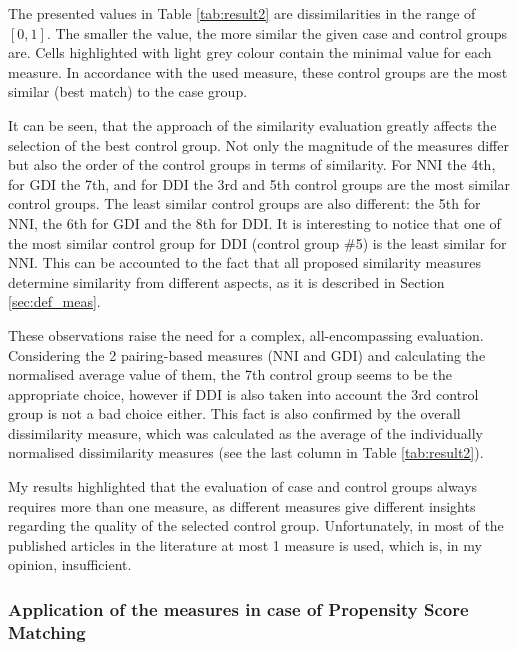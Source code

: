 		The presented values in Table \ref{tab:result2} are dissimilarities in the range of $[0,1]$. The smaller the value, the more similar the given case and control groups are.  Cells highlighted with light grey colour contain the minimal value for each measure. In accordance with the used measure, these control groups are the most similar (best match) to the case group.
				  
		It can be seen, that the approach of the similarity evaluation greatly affects the selection of the best control group. Not only the magnitude of the measures differ but also the order of the control groups in terms of similarity. For NNI the 4th, for GDI the 7th, and for DDI the 3rd and 5th control groups are the most similar control groups. The least similar control groups are also different: the 5th for NNI, the 6th for GDI and the 8th for DDI. It is interesting to notice that one of the most similar control group for DDI (control group \#5) is the least similar for NNI. This can be accounted to the fact that all proposed similarity measures determine similarity from different aspects, as it is described in Section \ref{sec:def_meas}.
								
		These observations raise the need for a complex, all-encompassing evaluation. Considering the 2 pairing-based measures (NNI and GDI) and calculating the normalised average value of them, the 7th control group seems to be the appropriate choice, however if DDI is also taken into account the 3rd control group is not a bad choice either. This fact is also confirmed by the overall dissimilarity measure, which was calculated as the average of the individually normalised dissimilarity measures (see the last column in Table \ref{tab:result2}).

        My results highlighted that the evaluation of case and control groups always requires more than one measure, as different measures give different insights regarding the quality of the selected control group. Unfortunately, in most of the published articles in the literature at most 1 measure is used, which is, in my opinion, insufficient.
								
		\subsubsection{Application of the measures in case of Propensity Score Matching}
		\label{subseq:qr_scen}
								
